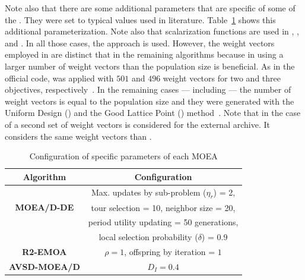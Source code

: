 Note also that there are some additional parameters that are specific of some of the \MOEAS{}.
%
They were set to typical values used in literature. 
%
Table~\ref{tab:Parametrization} shows this additional parameterization.
%
Note also that scalarization functions are used in \MOEADDE{}, \RMOEA{}, \NSGAIII{} and \AVSDMOEAD{}.
%
In all those cases, the \ASF{} approach is used.
%
However, the weight vectors employed in \RMOEA{} are distinct that in the remaining algorithms because in \RMOEA{} using
a larger number of weight vectors than the population size is beneficial.
%
As in the official code, \RMOEA{} was applied with $501$ and $496$ weight vectors for two and three objectives, 
respectively~\cite{trautmann2013r2}.
%
In the remaining cases --- including \AVSDMOEAD{} --- the number of weight vectors is equal to the population size and they were generated
with the Uniform Design (\UD{}) and the Good Lattice Point (\GLP{}) method~\cite{tan2013moea1, tan2013moea2}.
%
Note that in the case of \AVSDMOEAD{} a second set of weight vectors is considered for the external archive.
%
It considers the same weight vectors than \RMOEA{}.

\begin{table}[t]
\centering
\caption{Configuration of specific parameters of each MOEA}
\label{tab:Parametrization}
\begin{scriptsize}
\begin{tabular}{c|c}
\hline
\textbf{Algorithm} & \textbf{Configuration} \\ \hline
\multirow{3}{*}{
\textbf{MOEA/D-DE}} & Max. updates by sub-problem ($\eta_r$) = 2, \\
 & tour selection = 10,   neighbor size = 20, \\
 & period utility updating = 50 generations, \\
 & local selection probability ($\delta$) = 0.9\\ \hline
\textbf{R2-EMOA} & $\rho=1$, offspring by iteration = $1$ \\ \hline
\textbf{AVSD-MOEA/D} & $D_I=0.4$ \\ \hline
\end{tabular}
\end{scriptsize}
\end{table}








